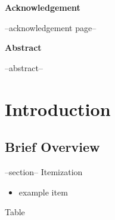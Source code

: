 \documentclass[a4paper,12pt,oneside, utf8x]{report}
\begin{document}
\linespread{1.6}\selectfont

\begin{titlepage}
\pagestyle{empty}
    \hfill \break \hfill \break
    {{\huge \centering \textbf{Acknowledgement}\par}
    \hfill \break \hfill \break
    --acknowledgement page--

    }
\end{titlepage}

\begin{titlepage}

\pagestyle{empty}
    \hfill \break \hfill \break
    {{\huge \centering \textbf{Abstract}\par}
    \hfill \break 
    --abstract--
    }
\end{titlepage}

\setlength{\cftbeforetoctitleskip}{-4em}
\setlength{\cftaftertoctitleskip}{-1.3em}
\setlength{\cftbeforeloftitleskip}{-4em}
\setlength{\cftafterloftitleskip}{-1.3em}
\setlength{\cftbeforelottitleskip}{-4em}
\setlength{\cftafterlottitleskip}{-1.3em}


\renewcommand{\contentsname}{\hfill Table of Contents \hfill}
\renewcommand{\cftaftertoctitle}{\hfill}
\tableofcontents
\newpage
\renewcommand{\listfigurename}{\hfill List of Figures \hfill}
\listoffigures
\newpage
\renewcommand{\listtablename}{\hfill List of Tables \hfill}
\listoftables


\chapter{Introduction}
\section{Brief Overview}
    --section--
	Itemization
    \begin{itemize}
        \item example item
    \end{itemize}
    
    Table
    
\end{document}
